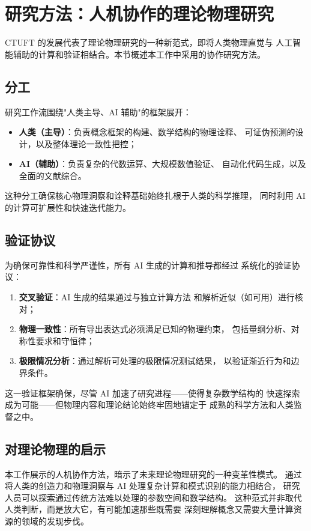 \section{研究方法：人机协作的理论物理研究}
\label{sec:methodology}

CTUFT 的发展代表了理论物理研究的一种新范式，即将人类物理直觉与
人工智能辅助的计算和验证相结合。本节概述本工作中采用的协作研究方法。

\subsection{分工}

研究工作流围绕"人类主导、AI 辅助"的框架展开：

\begin{itemize}
    \item \textbf{人类（主导）}：负责概念框架的构建、数学结构的物理诠释、
          可证伪预测的设计，以及整体理论一致性把控；
    
    \item \textbf{AI（辅助）}：负责复杂的代数运算、大规模数值验证、
          自动化代码生成，以及全面的文献综合。
\end{itemize}

这种分工确保核心物理洞察和诠释基础始终扎根于人类的科学推理，
同时利用 AI 的计算可扩展性和快速迭代能力。

\subsection{验证协议}

为确保可靠性和科学严谨性，所有 AI 生成的计算和推导都经过
系统化的验证协议：

\begin{enumerate}
    \item \textbf{交叉验证}：AI 生成的结果通过与独立计算方法
          和解析近似（如可用）进行核对；
    
    \item \textbf{物理一致性}：所有导出表达式必须满足已知的物理约束，
          包括量纲分析、对称性要求和守恒律；
    
    \item \textbf{极限情况分析}：通过解析可处理的极限情况测试结果，
          以验证渐近行为和边界条件。
\end{enumerate}

这一验证框架确保，尽管 AI 加速了研究进程——使得复杂数学结构的
快速探索成为可能——但物理内容和理论结论始终牢固地锚定于
成熟的科学方法和人类监督之中。

\subsection{对理论物理的启示}

本工作展示的人机协作方法，暗示了未来理论物理研究的一种变革性模式。
通过将人类的创造力和物理洞察与 AI 处理复杂计算和模式识别的能力相结合，
研究人员可以探索通过传统方法难以处理的参数空间和数学结构。
这种范式并非取代人类判断，而是放大它，有可能加速那些既需要
深刻理解概念又需要大量计算资源的领域的发现步伐。
